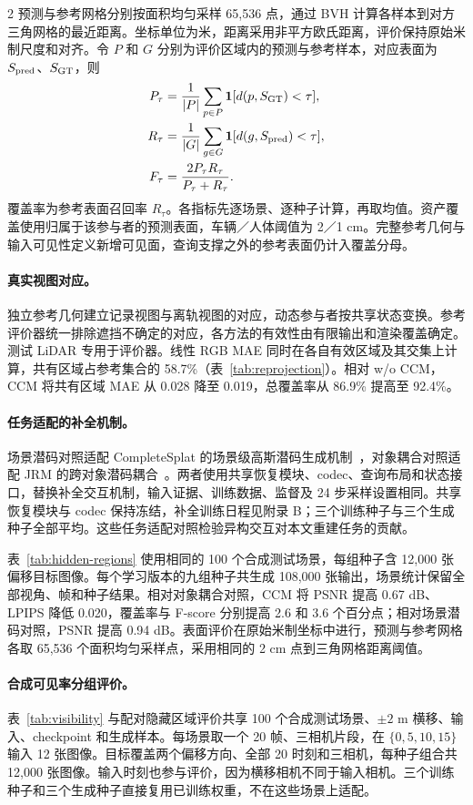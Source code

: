\begin{multicols}{2}
预测与参考网格分别按面积均匀采样 65,536 点，通过 BVH 计算各样本到对方三角网格的最近距离。坐标单位为米，距离采用非平方欧氏距离，评价保持原始米制尺度和对齐。令 $P$ 和 $G$ 分别为评价区域内的预测与参考样本，对应表面为 $S_{\rm pred}$、$S_{\rm GT}$，则
\begin{align}
P_\tau&=\frac{1}{|P|}\sum_{p\in P}\mathbf1[d(p,S_{\rm GT})<\tau],\\
R_\tau&=\frac{1}{|G|}\sum_{g\in G}\mathbf1[d(g,S_{\rm pred})<\tau],\\
F_\tau&=\frac{2P_\tau R_\tau}{P_\tau+R_\tau}.
\label{eq:geometry-metrics}
\end{align}
覆盖率为参考表面召回率 $R_\tau$。各指标先逐场景、逐种子计算，再取均值。资产覆盖使用归属于该参与者的预测表面，车辆／人体阈值为 2／1 cm。完整参考几何与输入可见性定义新增可见面，查询支撑之外的参考表面仍计入覆盖分母。

\paragraph{真实视图对应。}
独立参考几何建立记录视图与离轨视图的对应，动态参与者按共享状态变换。参考评价器统一排除遮挡不确定的对应，各方法的有效性由有限输出和渲染覆盖确定。测试 LiDAR 专用于评价器。线性 RGB MAE 同时在各自有效区域及其交集上计算，共有区域占参考集合的 58.7\%（表~\ref{tab:reprojection}）。相对 w/o CCM，CCM 将共有区域 MAE 从 0.028 降至 0.019，总覆盖率从 86.9\% 提高至 92.4\%。

\paragraph{任务适配的补全机制。}
场景潜码对照适配 CompleteSplat 的场景级高斯潜码生成机制~\cite{liao2025complete}，对象耦合对照适配 JRM 的跨对象潜码耦合~\cite{wu2026jrm}。两者使用共享恢复模块、codec、查询布局和状态接口，替换补全交互机制，输入证据、训练数据、监督及 24 步采样设置相同。共享恢复模块与 codec 保持冻结，补全训练日程见附录 B；三个训练种子与三个生成种子全部平均。这些任务适配对照检验异构交互对本文重建任务的贡献。

表~\ref{tab:hidden-regions} 使用相同的 100 个合成测试场景，每组种子含 12,000 张偏移目标图像。每个学习版本的九组种子共生成 108,000 张输出，场景统计保留全部视角、帧和种子结果。相对对象耦合对照，CCM 将 PSNR 提高 0.67 dB、LPIPS 降低 0.020，覆盖率与 F-score 分别提高 2.6 和 3.6 个百分点；相对场景潜码对照，PSNR 提高 0.94 dB。表面评价在原始米制坐标中进行，预测与参考网格各取 65,536 个面积均匀采样点，采用相同的 2 cm 点到三角网格距离阈值。

\paragraph{合成可见率分组评价。}
表~\ref{tab:visibility} 与配对隐藏区域评价共享 100 个合成测试场景、$\pm2$ m 横移、输入、checkpoint 和生成样本。每场景取一个 20 帧、三相机片段，在 $\{0,5,10,15\}$ 输入 12 张图像。目标覆盖两个偏移方向、全部 20 时刻和三相机，每种子组合共 12,000 张图像。输入时刻也参与评价，因为横移相机不同于输入相机。三个训练种子和三个生成种子直接复用已训练权重，不在这些场景上适配。


\end{multicols}

